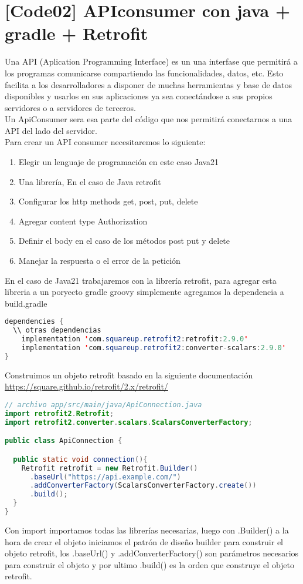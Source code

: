 \section{[Code02] APIconsumer con java + gradle + Retrofit}

Una API (Aplication Programming Interface) es un una interfase que permitirá a los programas comunicarse compartiendo las funcionalidades, datos, etc. Esto facilita a los desarrolladores a disponer de muchas herramientas y base de datos disponibles y usarlos en sus aplicaciones ya sea conectándose a sus propios servidores o a servidores de terceros.
\\
Un ApiConsumer sera esa parte del código que nos permitirá conectarnos a una API del lado del servidor.\\
Para crear un API consumer necesitaremos lo siguiente:
\begin{enumerate}
  \item Elegir un lenguaje de programación en este caso Java21
  \item Una librería, En el caso de Java retrofit
  \item Configurar los http methods get, post, put, delete
  \item Agregar content type Authorization
  \item Definir el body en el caso de los métodos post put y delete
  \item Manejar la respuesta o el error de la petición
\end{enumerate}
En el caso de Java21 trabajaremos con la librería retrofit, para agregar esta libreria a un poryecto gradle groovy simplemente agregamos la dependencia a build.gradle

\begin{lstlisting}[language=java]
dependencies {
  \\ otras dependencias
    implementation 'com.squareup.retrofit2:retrofit:2.9.0'
    implementation 'com.squareup.retrofit2:converter-scalars:2.9.0'
}
\end{lstlisting}
Construimos un objeto retrofit basado en la siguiente documentación \url{https://square.github.io/retrofit/2.x/retrofit/}
\begin{lstlisting}[language=java]
// archivo app/src/main/java/ApiConnection.java
import retrofit2.Retrofit;
import retrofit2.converter.scalars.ScalarsConverterFactory;

public class ApiConnection {

  public static void connection(){
    Retrofit retrofit = new Retrofit.Builder()
      .baseUrl("https://api.example.com/")
      .addConverterFactory(ScalarsConverterFactory.create())
      .build();
  }
}
\end{lstlisting}
Con import importamos todas las librerías necesarias, luego con .Builder() a la hora de crear el objeto iniciamos el patrón de diseño builder para construir el objeto retrofit, los .baseUrl() y .addConverterFactory() son parámetros necesarios para construir el objeto y por ultimo .build() es la orden que construye el objeto retrofit.

